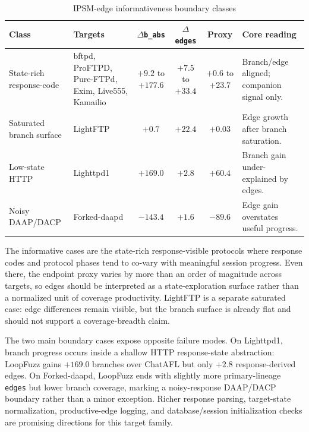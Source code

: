 \documentclass[final,5p,times,number]{elsarticle}
\begin{document}
\begin{table}[!t]
\centering
\caption{IPSM-edge informativeness boundary classes}
\label{tab:edge_productivity_boundary}
{\scriptsize
\setlength{\tabcolsep}{3.0pt}
\renewcommand{\arraystretch}{1.05}
\begin{tabularx}{\textwidth}{>{\raggedright\arraybackslash}p{}
                              >{\raggedright\arraybackslash}p{}
                              c c c X}
\toprule
Class & Targets & $\Delta$\texttt{b\_abs} & $\Delta$\texttt{edges} & Proxy & Core reading \\
\midrule
State-rich response-code & bftpd, ProFTPD, Pure-FTPd, Exim, Live555, Kamailio & $+9.2$ to $+177.6$ & $+7.5$ to $+33.4$ & $+0.6$ to $+23.7$ & Branch/edge aligned; companion signal only. \\
\midrule
Saturated branch surface & LightFTP & $+0.7$ & $+22.4$ & $+0.03$ & Edge growth after branch saturation. \\
\midrule
Low-state HTTP & Lighttpd1 & $+169.0$ & $+2.8$ & $+60.4$ & Branch gain under-explained by edges. \\
\midrule
Noisy DAAP/DACP & Forked-daapd & $-143.4$ & $+1.6$ & $-89.6$ & Edge gain overstates useful progress. \\
\bottomrule
\end{tabularx}
}
\end{table}

The informative cases are the state-rich response-visible protocols where response codes and protocol phases tend to co-vary with meaningful session progress. Even there, the endpoint proxy varies by more than an order of magnitude across targets, so edges should be interpreted as a state-exploration surface rather than a normalized unit of coverage productivity. LightFTP is a separate saturated case: edge differences remain visible, but the branch surface is already flat and should not support a coverage-breadth claim.

The two main boundary cases expose opposite failure modes. On Lighttpd1, branch progress occurs inside a shallow HTTP response-state abstraction: LoopFuzz gains $+169.0$ branches over ChatAFL but only $+2.8$ response-derived edges. On Forked-daapd, LoopFuzz ends with slightly more primary-lineage \texttt{edges} but lower branch coverage, marking a noisy-response DAAP/DACP boundary rather than a minor exception. Richer response parsing, target-state normalization, productive-edge logging, and database/session initialization checks are promising directions for this target family.
\end{document}
